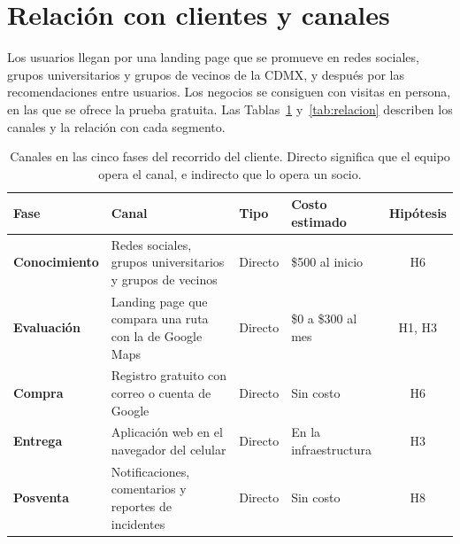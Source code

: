 \documentclass[11pt]{article}
\begin{document}
\section{Relación con clientes y canales}
\label{sec:canales}

Los usuarios llegan por una landing page que se promueve en redes sociales, grupos universitarios
y grupos de vecinos de la CDMX, y después por las recomendaciones entre usuarios. Los negocios se
consiguen con visitas en persona, en las que se ofrece la prueba gratuita. Las
Tablas~\ref{tab:canales} y~\ref{tab:relacion} describen los canales y la relación con cada segmento.

\begin{table}[H]
  \caption{Canales en las cinco fases del recorrido del cliente. Directo significa que el
    equipo opera el canal, e indirecto que lo opera un socio.}
  \label{tab:canales}
  \footnotesize
  \renewcommand{\arraystretch}{1.2}
  \begin{tabularx}{\textwidth}{@{}>{\bfseries}p{}Xp{}p{}c@{}}
    \toprule
    Fase & Canal & Tipo & Costo estimado & Hipótesis \\
    \midrule
    Conocimiento & Redes sociales, grupos universitarios y grupos de vecinos & Directo & \$500 al inicio & H6 \\
    Evaluación & Landing page que compara una ruta con la de Google Maps & Directo & \$0 a \$300 al mes & H1, H3 \\
    Compra & Registro gratuito con correo o cuenta de Google & Directo & Sin costo & H6 \\
    Entrega & Aplicación web en el navegador del celular & Directo & En la infraestructura & H3 \\
    Posventa & Notificaciones, comentarios y reportes de incidentes & Directo & Sin costo & H8 \\
    \bottomrule
  \end{tabularx}
\end{table}
\end{document}
